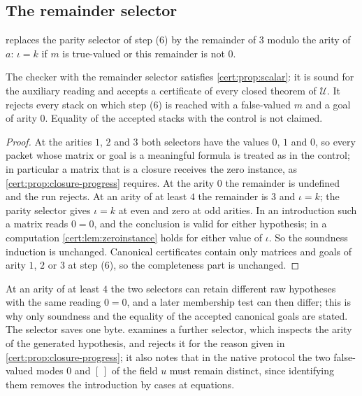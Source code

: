 \subsection{The remainder selector}

 replaces the parity selector of step (6) by the
remainder of $3$ modulo the arity of $a$: $\iota=k$ if $m$ is true-valued or
this remainder is not $0$.

\begin{proposition}\label{cert:prop:remainder}
The checker with the remainder selector satisfies \cref{cert:prop:scalar}: it
is sound for the auxiliary reading and accepts a certificate of every closed
theorem of $\mathcal U$. It rejects every stack on which step (6) is reached
with a false-valued $m$ and a goal of arity $0$. Equality of the accepted
stacks with the control is not claimed.
\end{proposition}
\begin{proof}
At the arities $1$, $2$ and $3$ both selectors have the values $0$, $1$ and
$0$, so every packet whose matrix or goal is a meaningful formula is treated
as in the control; in particular a matrix that is a closure receives the zero
instance, as \cref{cert:prop:closure-progress} requires. At the arity $0$ the
remainder is undefined and the run rejects. At an arity of at least $4$ the
remainder is $3$ and $\iota=k$; the parity selector gives $\iota=k$ at even
and zero at odd arities. In an introduction such a matrix reads $0=0$, and
the conclusion is valid for either hypothesis; in a computation
\cref{cert:lem:zeroinstance} holds for either value of $\iota$. So the
soundness induction is unchanged. Canonical certificates contain only
matrices and goals of arity $1$, $2$ or $3$ at step (6), so the completeness
part is unchanged.
\end{proof}

At an arity of at least $4$ the two selectors can retain different raw
hypotheses with the same reading $0=0$, and a later membership test can then
differ; this is why only soundness and the equality of the accepted canonical
goals are stated. The selector saves one byte.
 examines a further selector, which inspects the
arity of the generated hypothesis, and rejects it for the reason given in
\cref{cert:prop:closure-progress}; it also notes that in the native protocol
the two false-valued modes $0$ and $[\,]$ of the field $u$ must remain
distinct, since identifying them removes the introduction by cases at
equations.

